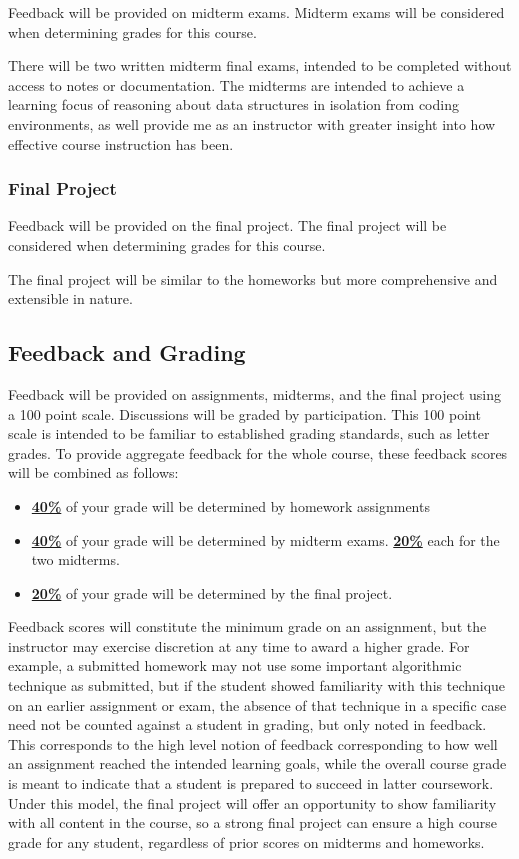 \documentclass[11pt]{article}
\begin{document}
Feedback will be provided on midterm exams.  Midterm exams will be considered when determining grades for this course.

There will be two written midterm final exams, intended to be completed
without access to notes or documentation. The midterms are intended to achieve a learning
focus of reasoning about data structures in isolation from coding environments,
as well provide me as an instructor with greater insight into how effective course
instruction has been.

\subsubsection*{Final Project}

Feedback will be provided on the final project. The final project will be considered when determining grades for this course.

The final project will be similar to the homeworks but more comprehensive and extensible in nature.

\subsection*{Feedback and Grading}
Feedback will be provided on assignments, midterms, and the final project using a 100 point scale.
Discussions will be graded by participation.
This 100 point scale is intended to be familiar to established grading standards, such as letter grades. To provide aggregate feedback for the whole course, these feedback scores will be combined as follows:
\begin{itemize}
	\item \underline{\textbf{40\%}} of your grade will be determined by homework assignments
	\item \underline{\textbf{40\%}} of your grade will be determined by midterm exams.
	\subitem \underline{\textbf{20\%}} each for the two midterms.
	\item \underline{\textbf{20\%}} of your grade will be determined by the final project.
\end{itemize}

\noindent Feedback scores will constitute the minimum grade on an assignment, but the instructor
may exercise discretion at any time to award a higher grade. For example, a submitted homework
may not use some important algorithmic technique as submitted, but if the student showed familiarity
with this technique on an earlier assignment or exam, the absence of that technique in a specific
case need not be counted against a student in grading, but only noted in feedback. This corresponds to the high level notion of feedback corresponding to how well an assignment reached the intended learning goals, while the overall course grade is meant to indicate that a student is prepared to succeed in latter coursework. Under this model, the final project will offer an opportunity to show familiarity with all content in the course, so a strong final project can ensure a high course grade
for any student, regardless of prior scores on midterms and homeworks.


\end{document}
